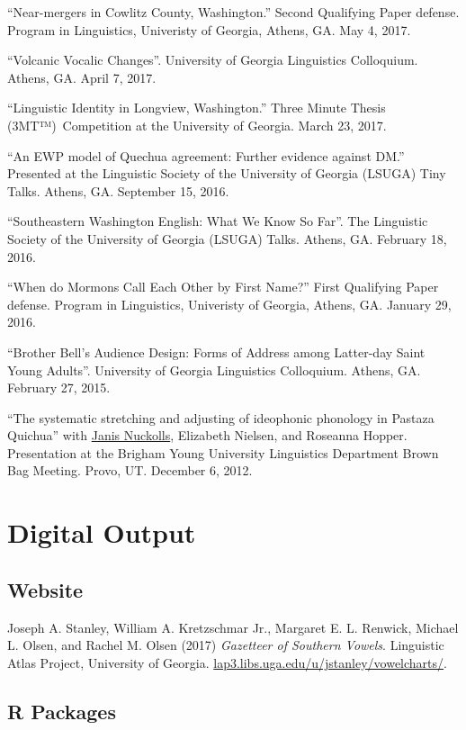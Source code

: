 \documentclass[
]{article}
\begin{document}
``Near-mergers in Cowlitz County, Washington.'' Second Qualifying Paper
defense. Program in Linguistics, Univeristy of Georgia, Athens, GA. May
4, 2017.

``Volcanic Vocalic Changes''. University of Georgia Linguistics
Colloquium. Athens, GA. April 7, 2017.

``Linguistic Identity in Longview, Washington.'' Three Minute Thesis
(3MT™)~Competition at the University of Georgia. March 23, 2017.

``An EWP model of Quechua agreement: Further evidence against DM.''
Presented at the Linguistic Society of the University of Georgia (LSUGA)
Tiny Talks. Athens, GA. September 15, 2016.

``Southeastern Washington English: What We Know So Far''. The Linguistic
Society of the University of Georgia (LSUGA) Talks. Athens, GA. February
18, 2016.

``When do Mormons Call Each Other by First Name?'' First Qualifying
Paper defense. Program in Linguistics, Univeristy of Georgia, Athens,
GA. January 29, 2016.

``Brother Bell's Audience Design: Forms of Address among Latter-day
Saint Young Adults''. University of Georgia Linguistics Colloquium.
Athens, GA. February 27, 2015.

``The systematic stretching and adjusting of ideophonic phonology in
Pastaza Quichua'' with
\href{https://hum.byu.edu/directory/janis-nuckolls}{Janis Nuckolls},
Elizabeth Nielsen, and Roseanna Hopper. Presentation at the Brigham
Young University Linguistics Department Brown Bag Meeting. Provo, UT.
December 6, 2012.

\hypertarget{digital-output}{%
\section{Digital Output}\label{digital-output}}

\hypertarget{website}{%
\subsection{Website}\label{website}}

{Joseph A. Stanley}, William A. Kretzschmar Jr., Margaret E. L. Renwick,
Michael L. Olsen, and Rachel M. Olsen (2017) \emph{Gazetteer of Southern
Vowels}. Linguistic Atlas Project, University of Georgia.
\href{http://lap3.libs.uga.edu/u/jstanley/vowelcharts/}{lap3.libs.uga.edu/u/jstanley/vowelcharts/}.

\hypertarget{r-packages}{%
\subsection{R Packages}\label{r-packages}}
\end{document}
